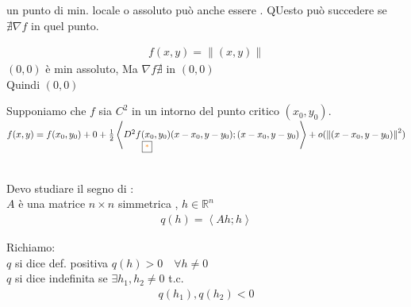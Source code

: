 \documentclass[a4paper, oneside]{article}
\begin{document}
        \begin{observation}
            un punto di min. locale o assoluto può anche essere . QUesto può succedere se $\nexists \nabla f$ in quel punto.\\
        \end{observation}
        \begin{example}
                \begin{gather*}
                    f(x,y) = \left\lVert (x,y) \right\rVert 
                \end{gather*}
                $(0,0)$ è min assoluto, Ma $\nabla f \nexists$ in $(0,0)$\\
                Quindi $(0,0)$ 
        \end{example}

        \begin{theorem}
            Supponiamo che $f$ sia $C^2$ in un intorno del punto critico $(x_0,y_0)$.\\
            $f(x,y) = f(x_0,y_0) + 0 + \frac{1}{2} \left\langle \underset{\text{\fbox{\textcolor{orange}{*}}}}{D^2f(x_0,y_0)}(x-x_0,y-y_0);(x-x_0,y-y_0)\right\rangle + o(\left\lVert (x-x_0,y-y_0)\right\rVert^2 )$
        \end{theorem}
        \hfil\\
        Devo studiare il segno di \fbox{\textcolor{orange}{*}}:\\
         $A$ è una matrice $n\times n$ simmetrica , $h \in \mathbb{R}^n$
        \begin{gather*}
            q(h) = \left\langle Ah;h \right\rangle 
        \end{gather*}

        \begin{proposition}
            Richiamo:\\
            $q$ si dice def. positiva  $q(h) > 0 \quad \forall h \neq 0$\\
            $q$ si dice indefinita se $\exists h_1,h_2 \neq 0$ t.c.
            \begin{gather*}
                q(h_1),q(h_2) < 0
            \end{gather*}
        \end{proposition}
\end{document}
